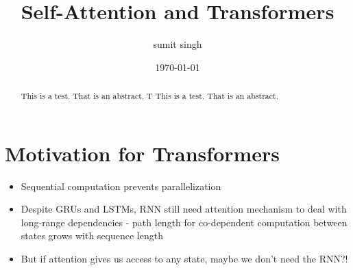 \documentclass{article}
\title{Self-Attention and Transformers}
\author{sumit singh}
\date{\today}
\begin{document}
\maketitle
\begin{abstract}
\noindent
This is a test. That is an abstract.  T This is a test. That is an abstract. 

\end{abstract}

\hspace{0.5in}
\section{Motivation for Transformers}
\begin{itemize}
    \item Sequential computation prevents parallelization
    \item Despite GRUs and LSTMs, RNN still need attention mechanism to deal with long-range dependencies - path length for co-dependent computation between states grows with sequence length
    \item But if attention gives us access to any state, maybe we don't need the RNN?!
\end{itemize}

\end{document}
